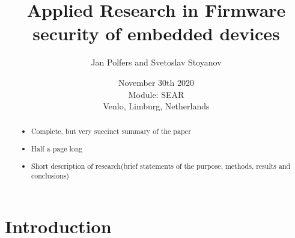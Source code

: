 \documentclass[]{report}
\title{Applied Research in Firmware security of embedded devices}
\author{Jan Polfers and Svetoslav Stoyanov}
\date{November 30th 2020 \\Module: SEAR \\Venlo, Limburg, Netherlands}
\begin{document}
\maketitle

\begin{abstract}

\begin{itemize}
	\item Complete, but very succinct summary of the paper
	\item Half a page long
	\item Short description of research(brief statements of the purpose, methods, results and conclusions)
\end{itemize}
\end{abstract}

\tableofcontents
\setcounter{page}{3}
\listoffigures %
\pagebreak

	
\section{Introduction}
\end{document}
